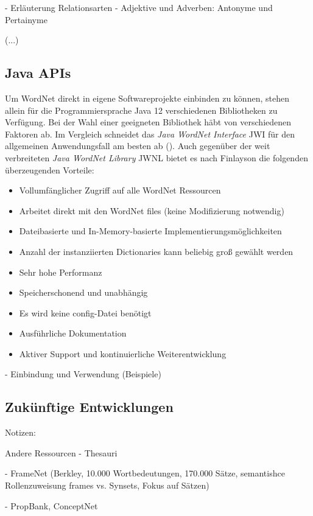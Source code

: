 - Erläuterung Relationsarten
- Adjektive und Adverben: Antonyme und Pertainyme

(...)

\subsection{Java APIs}

Um WordNet direkt in eigene Softwareprojekte einbinden zu können, stehen allein für die Programmiersprache Java 12 verschiedenen Bibliotheken zu Verfügung. Bei der Wahl einer geeigneten Bibliothek häbt von verschiedenen Faktoren ab. Im Vergleich schneidet das \textit{Java WordNet Interface} \ac{JWI} für den allgemeinen Anwendungsfall am besten ab (\cite[vgl.][2]{FINLAYSON}). Auch gegenüber der weit verbreiteten \textit{Java WordNet Library} \ac{JWNL} bietet es nach Finlayson die folgenden überzeugenden Vorteile:

\begin{itemize} 
\item Vollumfänglicher Zugriff auf alle WordNet Ressourcen
\item Arbeitet direkt mit den WordNet files (keine Modifizierung notwendig)
\item Dateibasierte und In-Memory-basierte Implementierungsmöglichkeiten
\item Anzahl der instanziierten Dictionaries kann beliebig groß gewählt werden
\item Sehr hohe Performanz
\item Speicherschonend und unabhängig
\item Es wird keine config-Datei benötigt 
\item Ausführliche Dokumentation
\item Aktiver Support und kontinuierliche Weiterentwicklung
\end{itemize}

- Einbindung und Verwendung (Beispiele)


\subsection{Zukünftige Entwicklungen}

Notizen:

Andere Ressourcen
-	Thesauri

-	FrameNet (Berkley, 10.000 Wortbedeutungen, 170.000
Sätze, semantishce Rollenzuweisung frames vs. Synsets, Fokus auf Sätzen)

-	PropBank, ConceptNet

